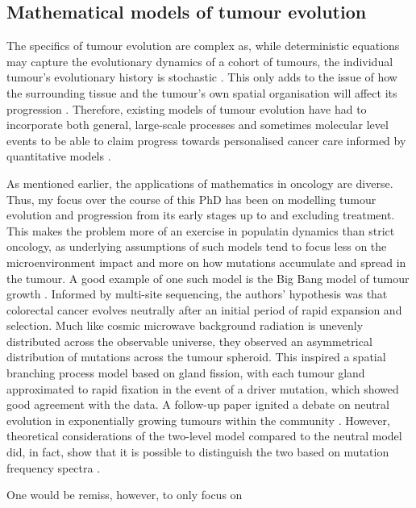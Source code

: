 \subsection{Mathematical models of tumour evolution}
The specifics of tumour evolution are complex as, while deterministic equations
may capture the evolutionary dynamics of a cohort of tumours, the individual
tumour's evolutionary history is stochastic \cite{werner_deterministic_2013}.
This only adds to the issue of how the surrounding tissue
\cite{west_normal_2021} and the tumour's own spatial organisation will affect
its progression \cite{noble_spatial_2022, li_mutation_2023}. Therefore,
existing models of tumour evolution have had to incorporate both general,
large-scale processes and sometimes molecular level events to be able to claim
progress towards personalised cancer care informed by quantitative models
\cite{yin_review_2019}. \par As mentioned earlier, the applications of
mathematics in oncology are diverse. Thus, my focus over the course of this PhD
has been on modelling tumour evolution and progression from its early stages up
to and excluding treatment. This makes the problem more of an exercise in
populatin dynamics than strict oncology, as underlying assumptions of such
models tend to focus less on the microenvironment impact and more on how
mutations accumulate and spread in the tumour. A good example of one such model
is the Big Bang model of tumour growth \cite{sottoriva_big_2015}. Informed by
multi-site sequencing, the authors' hypothesis was that colorectal cancer
evolves neutrally after an initial period of rapid expansion and selection.
Much like cosmic microwave background radiation is unevenly distributed across
the observable universe, they observed an asymmetrical distribution of
mutations across the tumour spheroid. This inspired a spatial branching process
model based on gland fission, with each tumour gland approximated to rapid
fixation in the event of a driver mutation, which showed good agreement with
the data. A follow-up paper \cite{williams_identification_2016} ignited a
debate on neutral evolution in exponentially growing tumours within the
community \cite{tarabichi_neutral_2018, mcdonald_currently_2018,
heide_reply_2018, bozic_measuring_2019}. However, theoretical considerations of
the two-level model compared to the neutral model did, in fact, show that it is
possible to distinguish the two based on mutation frequency spectra
\cite{tung_signatures_2021}.\par One would be remiss, however, to only focus on
